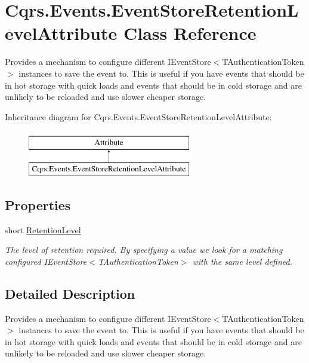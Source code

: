 \hypertarget{classCqrs_1_1Events_1_1EventStoreRetentionLevelAttribute}{}\section{Cqrs.\+Events.\+Event\+Store\+Retention\+Level\+Attribute Class Reference}
\label{classCqrs_1_1Events_1_1EventStoreRetentionLevelAttribute}


Provides a mechanism to configure different I\+Event\+Store$<$\+T\+Authentication\+Token$>$ instances to save the event to. This is useful if you have events that should be in hot storage with quick loads and events that should be in cold storage and are unlikely to be reloaded and use slower cheaper storage.  


Inheritance diagram for Cqrs.\+Events.\+Event\+Store\+Retention\+Level\+Attribute\+:\begin{figure}[H]
\begin{center}
\leavevmode
\includegraphics[height=2.000000cm]{classCqrs_1_1Events_1_1EventStoreRetentionLevelAttribute}
\end{center}
\end{figure}
\subsection*{Properties}
\begin{DoxyCompactItemize}
\item 
short \hyperlink{classCqrs_1_1Events_1_1EventStoreRetentionLevelAttribute_a02b46ba8653da7c44e39be7ee151cb2b}{Retention\+Level}
\begin{DoxyCompactList}\small\item\em The level of retention required. By specifying a value we look for a matching configured I\+Event\+Store$<$\+T\+Authentication\+Token$>$ with the same level defined. \end{DoxyCompactList}\end{DoxyCompactItemize}


\subsection{Detailed Description}
Provides a mechanism to configure different I\+Event\+Store$<$\+T\+Authentication\+Token$>$ instances to save the event to. This is useful if you have events that should be in hot storage with quick loads and events that should be in cold storage and are unlikely to be reloaded and use slower cheaper storage. 



